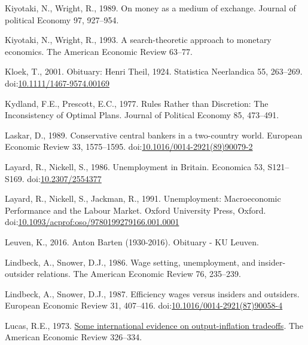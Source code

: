 \documentclass[
  12pt,
  onecolumn]{article}
\newlength{\cslhangindent}
\newlength{\cslentryspacingunit} %
\newenvironment{CSLReferences}[2] %
 {%
  \setlength{\parindent}{0pt}
  \ifodd #1
  \let\oldpar\par
  \def\par{\hangindent=\cslhangindent\oldpar}
  \fi
  \setlength{\parskip}{#2\cslentryspacingunit}
 }%
 {}
\begin{document}
\begin{CSLReferences}{1}{0}
\leavevmode{}%
Kiyotaki, N., Wright, R., 1989. On money as a medium of exchange.
Journal of political Economy 97, 927--954.

\leavevmode{}%
Kiyotaki, N., Wright, R., 1993. A search-theoretic approach to monetary
economics. The American Economic Review 63--77.

\leavevmode{}%
Kloek, T., 2001. Obituary: {Henri Theil}, 1924.
Statistica Neerlandica 55, 263--269.
doi:\href{https://doi.org/10.1111/1467-9574.00169}{10.1111/1467-9574.00169}

\leavevmode{}%
Kydland, F.E., Prescott, E.C., 1977. Rules {Rather} than {Discretion}:
{The Inconsistency} of {Optimal Plans}. Journal of Political Economy 85,
473--491.

\leavevmode{}%
Laskar, D., 1989. Conservative central bankers in a two-country world.
European Economic Review 33, 1575--1595.
doi:\href{https://doi.org/10.1016/0014-2921(89)90079-2}{10.1016/0014-2921(89)90079-2}

\leavevmode{}%
Layard, R., Nickell, S., 1986. Unemployment in {Britain}. Economica 53,
S121--S169. doi:\href{https://doi.org/10.2307/2554377}{10.2307/2554377}

\leavevmode{}%
Layard, R., Nickell, S., Jackman, R., 1991. Unemployment: {Macroeconomic
Performance} and the {Labour Market}. {Oxford University Press},
{Oxford}.
doi:\href{https://doi.org/10.1093/acprof:oso/9780199279166.001.0001}{10.1093/acprof:oso/9780199279166.001.0001}

\leavevmode{}%
Leuven, K., 2016. Anton {Barten} (1930-2016). Obituary - KU Leuven.

\leavevmode{}%
Lindbeck, A., Snower, D.J., 1986. Wage setting, unemployment, and
insider-outsider relations. The American Economic Review 76, 235--239.

\leavevmode{}%
Lindbeck, A., Snower, D.J., 1987. Efficiency wages versus insiders and
outsiders. European Economic Review 31, 407--416.
doi:\href{https://doi.org/10.1016/0014-2921(87)90058-4}{10.1016/0014-2921(87)90058-4}

\leavevmode{}%
Lucas, R.E., 1973. \href{http://www.jstor.org/stable/1914364}{Some
international evidence on output-inflation tradeoffs}. The American
Economic Review 326--334.


\end{CSLReferences}
\end{document}
